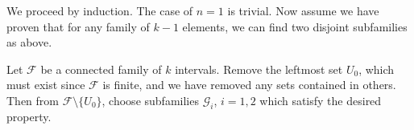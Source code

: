 \documentclass[11pt, reqno]{article}
\theoremstyle{plain}
\theoremstyle{definition}
\theoremstyle{remark}
\begin{document}
\begin{enumerate}
    We proceed by induction. The case of $n = 1$ is trivial. Now assume we have proven that for any family of $k-1$ elements,
    we can find two disjoint subfamilies as above. 

    Let $\mathscr{F}$ be a connected family of $k$ intervals. Remove the leftmost set $U_0$, which must exist since $\mathscr{F}$ is finite, and we 
    have removed any sets contained in others. Then from $\mathscr{F}\setminus\{U_0\}$, choose subfamilies $\mathscr{G}_i$, $i = 1,2$
    which satisfy the desired property.

    
\end{enumerate}
\end{document}
